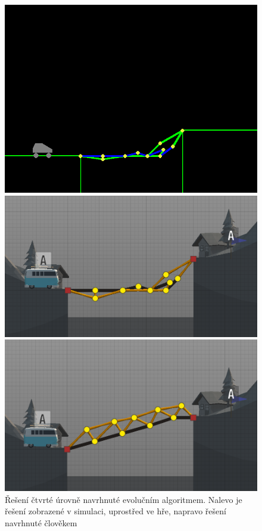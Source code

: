 \begin{figure}[ht]
    \centering
    \begin{minipage}{0.32\textwidth}
        \centering
        \includegraphics[width=\linewidth]{img/lvl4-sim-ea}
    \end{minipage}\hfill
    \begin{minipage}{0.32\textwidth}
        \centering
        \includegraphics[width=\linewidth]{img/lvl4-poly-ea}
    \end{minipage}
    \begin{minipage}{0.32\textwidth}
        \centering
        \includegraphics[width=\linewidth]{img/lvl4-poly-human}
    \end{minipage}
    \caption{Řešení čtvrté úrovně navrhnuté evolučním algoritmem. Nalevo je řešení zobrazené v simulaci, uprostřed ve hře, napravo řešení navrhnuté člověkem}
    \label{exp:lvl4}
\end{figure}


